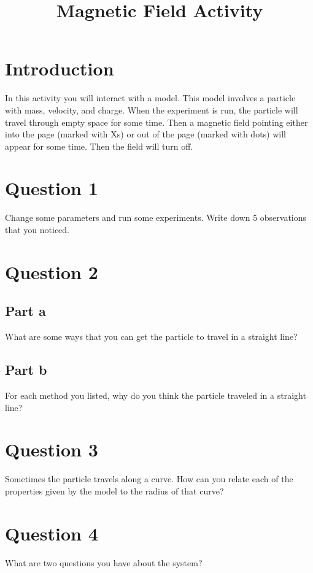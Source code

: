 \documentclass[11pt]{article}
\title{Magnetic Field Activity}
\author{}
\date{}
\begin{document}
	
	\maketitle
	
	\raggedright
	
	
	\section*{Introduction}
	
	In this activity you will interact with a model. This model involves a particle with mass, velocity, and charge. When the experiment is run, the particle will travel through empty space for some time. Then a magnetic field pointing either into the page (marked with Xs) or out of the page (marked with dots) will appear for some time. Then the field will turn off.
	
	\section*{Question 1}
	Change some parameters and run some experiments. Write down 5 observations that you noticed. \\[180 pt]
	
	\section*{Question 2}
	\subsection*{Part a}
	What are some ways that you can get the particle to travel in a straight line? \\[100 pt]
	
	\subsection*{Part b}
	For each method you listed, why do you think the particle traveled in a straight line? \\[100 pt]
	
	\section*{Question 3}
	Sometimes the particle travels along a curve. How can you relate each of the properties given by the model to the radius of that curve? \\[150 pt]
	
	\section*{Question 4}
	What are two questions you have about the system? \\[150 pt]
	
\end{document}
